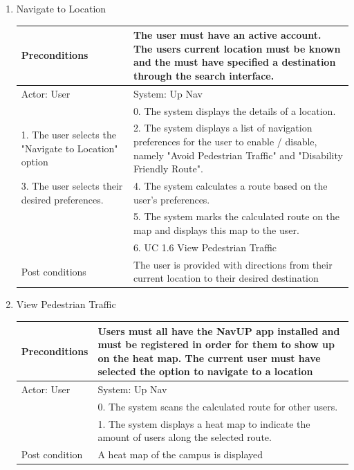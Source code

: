 \documentclass{article}
\begin{document}
\begin{center}
\begin{enumerate}
\begin{enumerate}
	\item{Navigate to Location}
	\begin{table}[]
	\centering
		\begin{tabular}{ | m{15em} | m{15em}| }
		\hline 
		Preconditions                                                                                 						& The user must have an active account. The users current location must be known and the must have specified a destination through the search interface. \\ 
		\hline
		Actor: User                                                                                  						& System: Up Nav \\ 
		\hline
                                                                                             									& 0. The system displays the details of a location. \\ 
		\hline
		1. The user selects the "Navigate to Location" option                                        				& 2. The system displays a list of navigation preferences for the user to enable / disable, namely "Avoid Pedestrian Traffic" and "Disability Friendly Route". \\
		\hline
		3. The user selects their desired preferences.                                               				& 4. The system calculates a route based on the user's preferences. \\ 
		\hline
                                                                                            									& 5. The system marks the calculated route on the map and displays this map to the user. \\ 
		\hline
																	& 6. UC 1.6 View Pedestrian Traffic \\
		\hline
		Post conditions                                                                               						& The user is provided with directions from their current location to their desired destination \\ 
		\hline
		\end{tabular}
	\end{table}

	\item{View Pedestrian Traffic}
	\begin{table}[]
	\centering
		\begin{tabular}{ | m{15em} | m{15em}| }
		\hline
		Preconditions													& Users must all have the NavUP app installed and must be registered in order for them to show up on the heat map. The current user must have selected the option to navigate to a location \\
		\hline
		Actor: User														& System: Up Nav \\
		\hline
																	& 0. The system scans the calculated route for other users. \\
		\hline
																	& 1. The system displays a heat map to indicate the amount of users along the selected route. \\
		\hline
		Post condition													& A heat map of the campus is displayed \\
		\hline


\end{tabular}
\end{table}
\end{enumerate}
\end{enumerate}
\end{center}
\end{document}

